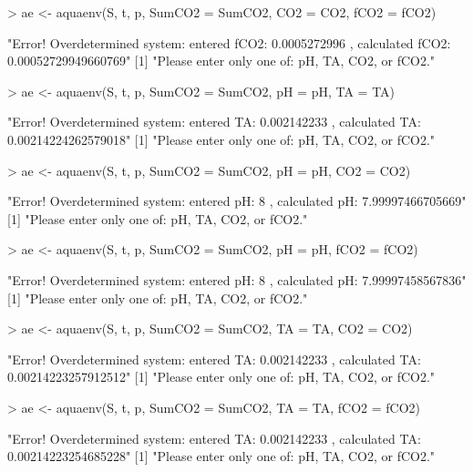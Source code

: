 \documentclass[article,nojss]{jss}
\begin{document}
\begin{scriptsize}
\begin{Schunk}
\begin{Sinput}
> ae <- aquaenv(S, t, p, SumCO2 = SumCO2, CO2 = CO2, fCO2 = fCO2)
\end{Sinput}
\begin{Soutput}
[1] "Error! Overdetermined system: entered fCO2: 0.0005272996 , calculated fCO2: 0.00052729949660769"
[1] "Please enter only one of: pH, TA, CO2, or fCO2."
\end{Soutput}
\begin{Sinput}
> ae <- aquaenv(S, t, p, SumCO2 = SumCO2, pH = pH, TA = TA)
\end{Sinput}
\begin{Soutput}
[1] "Error! Overdetermined system: entered TA: 0.002142233 , calculated TA: 0.00214224262579018"
[1] "Please enter only one of: pH, TA, CO2, or fCO2."
\end{Soutput}
\begin{Sinput}
> ae <- aquaenv(S, t, p, SumCO2 = SumCO2, pH = pH, CO2 = CO2)
\end{Sinput}
\begin{Soutput}
[1] "Error! Overdetermined system: entered pH: 8 , calculated pH: 7.99997466705669"
[1] "Please enter only one of: pH, TA, CO2, or fCO2."
\end{Soutput}
\begin{Sinput}
> ae <- aquaenv(S, t, p, SumCO2 = SumCO2, pH = pH, fCO2 = fCO2)
\end{Sinput}
\begin{Soutput}
[1] "Error! Overdetermined system: entered pH: 8 , calculated pH: 7.99997458567836"
[1] "Please enter only one of: pH, TA, CO2, or fCO2."
\end{Soutput}
\begin{Sinput}
> ae <- aquaenv(S, t, p, SumCO2 = SumCO2, TA = TA, CO2 = CO2)
\end{Sinput}
\begin{Soutput}
[1] "Error! Overdetermined system: entered TA: 0.002142233 , calculated TA: 0.00214223257912512"
[1] "Please enter only one of: pH, TA, CO2, or fCO2."
\end{Soutput}
\begin{Sinput}
> ae <- aquaenv(S, t, p, SumCO2 = SumCO2, TA = TA, fCO2 = fCO2)
\end{Sinput}
\begin{Soutput}
[1] "Error! Overdetermined system: entered TA: 0.002142233 , calculated TA: 0.00214223254685228"
[1] "Please enter only one of: pH, TA, CO2, or fCO2."
\end{Soutput}
\end{Schunk}
\end{scriptsize}
\end{document}
